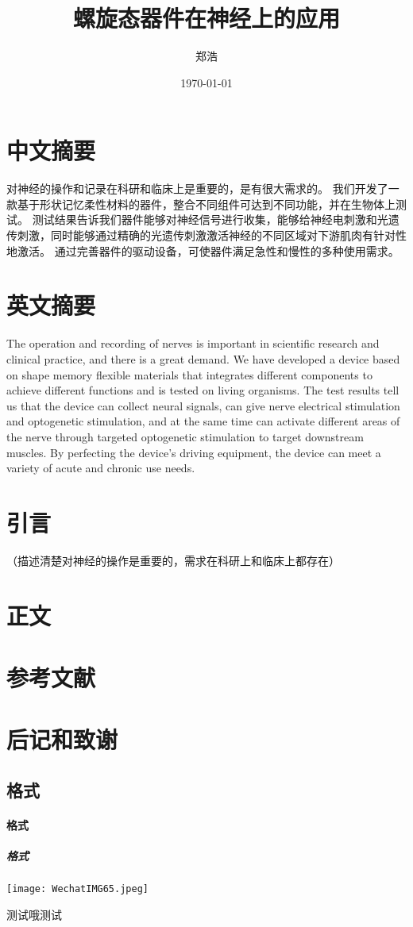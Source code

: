 \documentclass{article}
\title{螺旋态器件在神经上的应用}
\author{郑浩}
\date{\today}
\begin{document}
	\maketitle
	\tableofcontents
	
	
	\section{中文摘要}
		对神经的操作和记录在科研和临床上是重要的，是有很大需求的。
		我们开发了一款基于形状记忆柔性材料的器件，整合不同组件可达到不同功能，并在生物体上测试。
		测试结果告诉我们器件能够对神经信号进行收集，能够给神经电刺激和光遗传刺激，同时能够通过精确的光遗传刺激激活神经的不同区域对下游肌肉有针对性地激活。
		通过完善器件的驱动设备，可使器件满足急性和慢性的多种使用需求。
	\section{英文摘要}
		The operation and recording of nerves is important in scientific research and clinical practice, and there is a great demand.
		We have developed a device based on shape memory flexible materials that integrates different components to achieve different functions and is tested on living organisms.
		The test results tell us that the device can collect neural signals, can give nerve electrical stimulation and optogenetic stimulation, and at the same time can activate different areas of the nerve through targeted optogenetic stimulation to target downstream muscles.
		By perfecting the device's driving equipment, the device can meet a variety of acute and chronic use needs.
	\section{引言}
		（描述清楚对神经的操作是重要的，需求在科研上和临床上都存在）
	\section{正文}
	\section{参考文献}
	\section{后记和致谢}
	
	
	\subsection{格式}
	\paragraph{格式}
	\subparagraph{格式}
	
	\texttt{[image: WechatIMG65.jpeg]}
	
	测试哦测试
	
\end{document}
